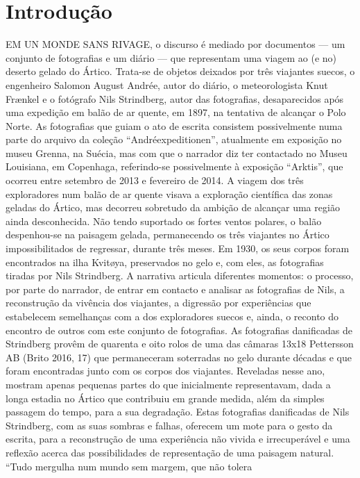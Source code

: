 \documentclass{article}
\begin{document}
\section{Introdução}
EM UN MONDE SANS RIVAGE, o discurso é mediado por documentos — um conjunto
de fotografias e um diário — que representam uma viagem ao (e no) deserto gelado
do Ártico. Trata-se de objetos deixados por três viajantes suecos, o engenheiro Salomon August Andrée, autor do diário, o meteorologista Knut Frænkel e o fotógrafo
Nils Strindberg, autor das fotografias, desaparecidos após uma expedição em balão
de ar quente, em 1897, na tentativa de alcançar o Polo Norte. As fotografias que
guiam o ato de escrita consistem possivelmente numa parte do arquivo da coleção
“Andréexpeditionen”, atualmente em exposição no museu Grenna, na Suécia, mas
com que o narrador diz ter contactado no Museu Louisiana, em Copenhaga, referindo-se possivelmente à exposição “Arktis”, que ocorreu entre setembro de 2013 e
fevereiro de 2014. A viagem dos três exploradores num balão de ar quente visava a
exploração científica das zonas geladas do Ártico, mas decorreu sobretudo da ambição de alcançar uma região ainda desconhecida. Não tendo suportado os fortes ventos
polares, o balão despenhou-se na paisagem gelada, permanecendo os três viajantes
no Ártico impossibilitados de regressar, durante três meses. Em 1930, os seus corpos
foram encontrados na ilha Kvitøya, preservados no gelo e, com eles, as fotografias
tiradas por Nils Strindberg. A narrativa articula diferentes momentos: o processo,
por parte do narrador, de entrar em contacto e analisar as fotografias de Nils, a reconstrução da vivência dos viajantes, a digressão por experiências que estabelecem
semelhanças com a dos exploradores suecos e, ainda, o reconto do encontro de outros
com este conjunto de fotografias. As fotografias danificadas de Strindberg provêm de
quarenta e oito rolos de uma das câmaras 13x18 Pettersson AB (Brito 2016, 17) que
permaneceram soterradas no gelo durante décadas e que foram encontradas junto
com os corpos dos viajantes. Reveladas nesse ano, mostram apenas pequenas partes
do que inicialmente representavam, dada a longa estadia no Ártico que contribuiu
em grande medida, além da simples passagem do tempo, para a sua degradação.
Estas fotografias danificadas de Nils Strindberg, com as suas sombras e falhas, oferecem um mote para o gesto da escrita, para a reconstrução de uma experiência não
vivida e irrecuperável e uma reflexão acerca das possibilidades de representação de
uma paisagem natural. “Tudo mergulha num mundo sem margem, que não tolera
\end{document}
